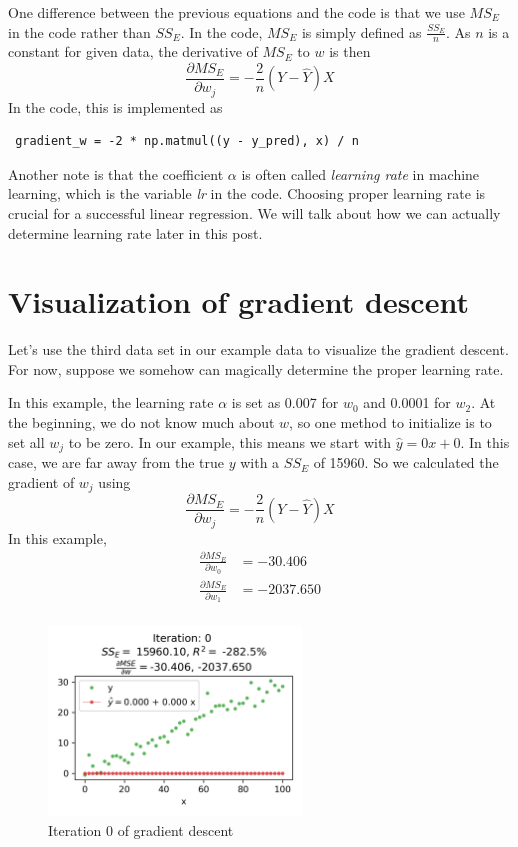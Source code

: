 \documentclass[
	letterpaper
]{article}
\begin{document}
One difference between the previous equations and the code is that we use $MS_E$ in the code rather than $SS_E$.
In the code, $MS_E$ is simply defined as $\frac{SS_E}{n}$.
As $n$ is a constant for given data, the derivative of $MS_E$ to $w$ is then
\begin{equation}
\frac{\partial MS_E}{\partial w_j} = -\frac{2}{n} (Y - \hat Y)X
\end{equation}
In the code, this is implemented as 
\begin{lstlisting}
 gradient_w = -2 * np.matmul((y - y_pred), x) / n
\end{lstlisting}

Another note is that the coefficient $\alpha$ is often called \textit{learning rate} in machine learning, which is the variable \textit{lr} in the code. 
Choosing proper learning rate is crucial for a successful linear regression.
We will talk about how we can actually determine learning rate later in this post.

\section{Visualization of gradient descent}
Let's use the third data set in our example data to visualize the gradient descent.
For now, suppose we somehow can magically determine the proper learning rate.

In this example, the learning rate $\alpha$ is set as 0.007 for $w_0$ and 0.0001 for $w_2$.
At the beginning, we do not know much about $w$, so one method to initialize is to set all $w_j$ to be zero.
In our example, this means we start with $\hat y = 0 x + 0$.
In this case, we are far away from the true $y$ with a $SS_E$ of 15960.
So we calculated the gradient of $w_j$ using
\begin{equation}
\frac{\partial MS_E}{\partial w_j} = -\frac{2}{n} (Y - \hat Y)X
\end{equation}
In this example,
\begin{equation}
\begin{split}
\frac{\partial MS_E}{\partial w_0} &= -30.406\\
\frac{\partial MS_E}{\partial w_1} &= -2037.650\\
\end{split}
\end{equation}
\begin{figure}[htbp]
	\centering
	\includegraphics[width=0.6\textwidth]{figures/visualize-0.png}
	\caption{Iteration 0 of gradient descent}
	\label{fig:vis0}
\end{figure}
\end{document}
